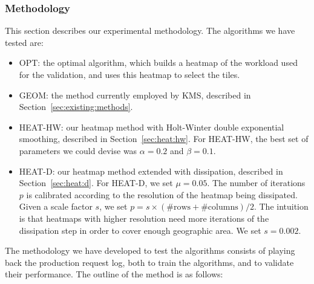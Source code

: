 \documentclass[11pt, oneside]{report}
\begin{document}
\subsubsection{Methodology}
\label{sec:methods}

This section describes our experimental methodology. The algorithms we have tested are:

\begin{itemize}

\item OPT: the optimal algorithm, which builds a heatmap of the workload used for the validation, and uses this heatmap to select the tiles. 

\item GEOM: the method currently employed by KMS, described in Section~\ref{sec:existing:methods}.

\item HEAT-HW: our heatmap method with Holt-Winter double exponential smoothing, described in Section~\ref{sec:heat:hw}. For HEAT-HW, the best set of parameters we could devise was $\alpha = 0.2$ and $\beta = 0.1$. 

\item HEAT-D: our heatmap method extended with dissipation, described in Section~\ref{sec:heat:d}. For HEAT-D, we set $\mu = 0.05$. The number of iterations $p$ is calibrated according to the resolution of the heatmap being dissipated. Given a scale factor $s$, we set $p = s \times (\text{\#rows}+\text{\#columns})/2$. The intuition is that heatmaps with higher resolution need more iterations of the dissipation step in order to cover enough geographic area. We set $s = 0.002$. 

\end{itemize}

The methodology we have developed to test the algorithms consists of playing back the production request log, both to train the algorithms, and to validate their performance. The outline of the method is as follows:
\end{document}
